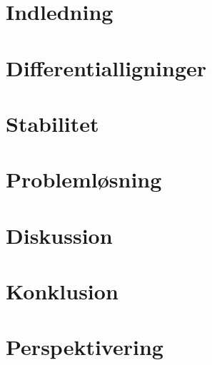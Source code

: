 

 



\chapter{Indledning}
    
    
\chapter{Differentialligninger}
    
    
    
\chapter{Stabilitet}
    

\chapter{Problemløsning}
    

\chapter{Diskussion}
    
    
\chapter{Konklusion}
    

\chapter{Perspektivering}
    





